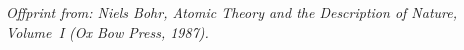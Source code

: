 \documentclass[12pt,a4paper]{article}
\begin{document}
\thispagestyle{fancy}
{\footnotesize\itshape Offprint from: Niels Bohr, \emph{Atomic Theory and the Description of Nature}, Volume~I
 (Ox Bow Press, 1987).\par}
\medskip


\end{document}
